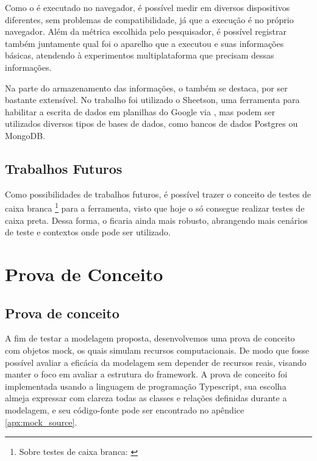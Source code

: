 \documentclass[12pt]{tcc}
\begin{document}
Como o  é executado no navegador, é possível medir em diversos dispositivos diferentes, sem problemas de compatibilidade, já que a execução é no próprio navegador. Além da métrica escolhida pelo pesquisador, é possível registrar também juntamente qual foi o aparelho que a executou e suas informações básicas, atendendo à experimentos multiplataforma que precisam dessas informações.

Na parte do armazenamento das informações, o  também se destaca, por ser bastante extensível. No trabalho foi utilizado o Sheetson, uma ferramenta para habilitar a escrita de dados em planilhas do Google via , mas podem ser utilizados diversos tipos de bases de dados, como bancos de dados Postgres ou MongoDB.




\section{Trabalhos Futuros}
\label{section:trabalhos-futuros}

Como possibilidades de trabalhos futuros, é possível trazer o conceito de testes de caixa branca \footnote{Sobre testes de caixa branca: \citep[Capítulo 21]{Sommerville2015Software}} para a ferramenta, visto que hoje o  só consegue realizar testes de caixa preta. Dessa forma, o  ficaria ainda mais robusto, abrangendo mais cenários de teste e contextos onde pode ser utilizado.

\label{bibpage}
\renewcommand\bibname{Referências}

%

\label{bibfinalpage}

\label{lastpage}



\appendix
\chapter{Prova de Conceito}
\label{apx:mock}

\section{Prova de conceito}
\label{cap:prova_de_conceito}

A fim de testar a modelagem proposta, desenvolvemos uma prova de conceito com objetos mock, os quais simulam recursos computacionais.
De modo que fosse possível avaliar a eficácia da modelagem sem depender de recursos reais, visando manter o foco em avaliar a estrutura do framework.
A prova de conceito foi implementada usando a linguagem de programação Typescript, sua escolha almeja expressar com clareza todas as classes e relações definidas durante a modelagem, e seu código-fonte pode ser encontrado no apêndice \ref{apx:mock_source}.
\end{document}
